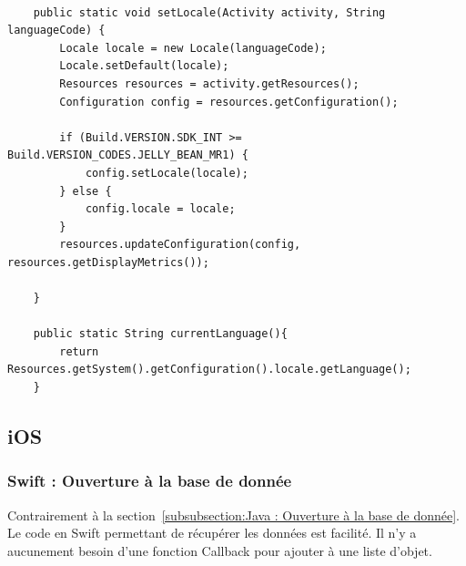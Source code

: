 \documentclass{article}
\begin{document}
\begin{verbatim}
   
    public static void setLocale(Activity activity, String languageCode) {
        Locale locale = new Locale(languageCode);
        Locale.setDefault(locale);
        Resources resources = activity.getResources();
        Configuration config = resources.getConfiguration();
        
        if (Build.VERSION.SDK_INT >= Build.VERSION_CODES.JELLY_BEAN_MR1) {
            config.setLocale(locale);
        } else {
            config.locale = locale;
        }
        resources.updateConfiguration(config, resources.getDisplayMetrics());

    }

    public static String currentLanguage(){
        return Resources.getSystem().getConfiguration().locale.getLanguage();
    }

\end{verbatim}




\newpage %




\subsection{iOS} %
\label{subsection:iOS} 


\subsubsection{Swift : Ouverture à la base de donnée}
\label{subsubsection:Swift : Ouverture à la base de donnée} 
Contrairement à la section~\ref{subsubsection:Java : Ouverture à la base de donnée}. Le code en Swift permettant de récupérer les données
est facilité. Il n'y a aucunement besoin d'une fonction Callback pour ajouter à une liste d'objet.
\end{document}

